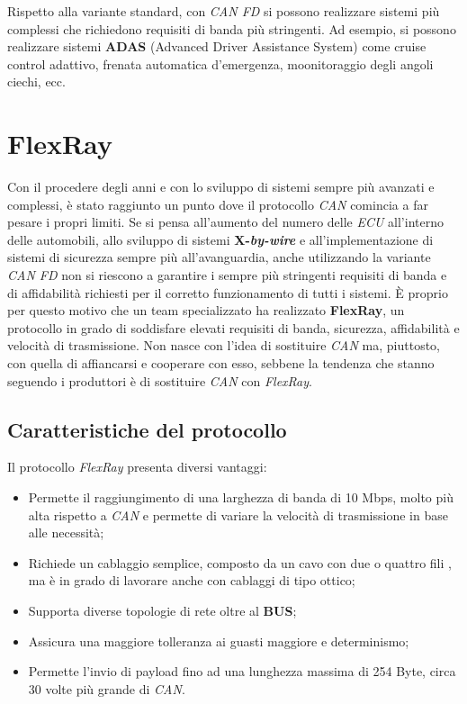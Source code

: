Rispetto alla variante standard, con \emph{CAN FD} si possono realizzare sistemi più complessi che richiedono requisiti di banda più stringenti. Ad esempio, si possono realizzare sistemi \textbf{ADAS} (Advanced Driver Assistance System) come cruise control adattivo, frenata automatica d'emergenza, moonitoraggio degli angoli ciechi, ecc. \cite{css_electronics_canfd}

\section{FlexRay}
Con il procedere degli anni e con lo sviluppo di sistemi sempre più avanzati e complessi, è stato raggiunto un punto dove il protocollo \emph{CAN} comincia a far pesare i propri limiti. Se si pensa all'aumento del numero delle \emph{ECU} all'interno delle automobili, allo sviluppo di sistemi \textbf{X-\emph{by-wire}} e all'implementazione di sistemi di sicurezza sempre più all'avanguardia, anche utilizzando la variante \emph{CAN FD} non si riescono a garantire i sempre più stringenti requisiti di banda e di affidabilità richiesti per il corretto funzionamento di tutti i sistemi. È proprio per questo motivo che un team specializzato ha realizzato \textbf{FlexRay}, un protocollo in grado di soddisfare elevati requisiti di banda, sicurezza, affidabilità e velocità di trasmissione. Non nasce con l'idea di sostituire \emph{CAN} ma, piuttosto, con quella di affiancarsi e cooperare con esso, sebbene la tendenza che stanno seguendo i produttori è di sostituire \emph{CAN} con \emph{FlexRay}.

\subsection{Caratteristiche del protocollo}
Il protocollo \emph{FlexRay} presenta diversi vantaggi:
\begin{itemize}
    \item Permette il raggiungimento di una larghezza di banda di 10 Mbps, molto più alta rispetto a \emph{CAN} e permette di variare la velocità di trasmissione in base alle necessità;
    \item Richiede un cablaggio semplice, composto da un cavo con due o quattro fili \cite{ni_flexray}, ma è in grado di lavorare anche con cablaggi di tipo ottico;
    \item Supporta diverse topologie di rete oltre al \textbf{BUS};
    \item Assicura una maggiore tolleranza ai guasti maggiore e determinismo;
    \item Permette l'invio di payload fino ad una lunghezza massima di 254 Byte, circa 30 volte più grande di \emph{CAN}.
\end{itemize}

